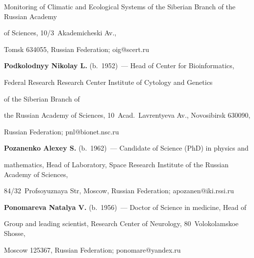 Monitoring of Climatic and Ecological Systems of the Siberian Branch of the Russian Academy 


of Sciences, 10/3~Akademicheski Av., 


Tomsk 634055, Russian Federation; oig@scert.ru


       


\pagebreak





\noindent


       \textbf{Podkolodnyy Nikolay L.} (b.\ 1952)~--- Head of Center for Bioinformatics, 


Federal Research Research Center Institute of Cytology and Genetics 


of the Siberian Branch of 


the Russian Academy of Sciences, 10~Acad.\ Lavrentyeva Av., Novosibirsk 630090, 


Russian Federation; pnl@bionet.nsc.ru


       


\vspace*{3pt}





\noindent


       \textbf{Pozanenko Alexey S.} (b.\ 1962)~--- Candidate of Science (PhD) in physics and 


mathematics, Head of Laboratory, Space Research Institute of the Russian Academy of Sciences, 


84/32~Profsoyuznaya Str, Moscow, Russian Federation; apozanen@iki.rssi.ru


       


\vspace*{3pt}





\noindent


       \textbf{Ponomareva Natalya V.} (b.\ 1956)~--- Doctor of Science in medicine, Head of 


Group and leading scientist, Research Center of Neurology, 80~Volokolamskoe Shosse, 


Moscow 125367, Russian Federation; ponomare@yandex.ru


       


\vspace*{3pt}





